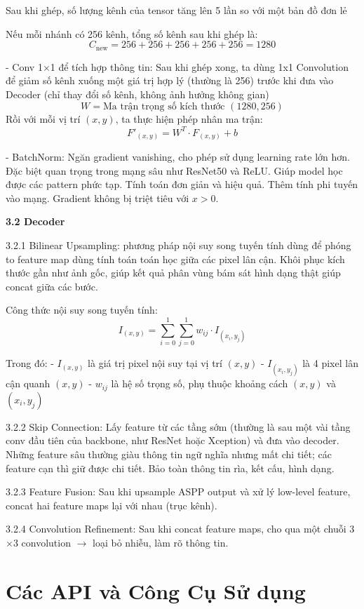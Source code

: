 \documentclass[12pt]{report}
\begin{document}
Sau khi ghép, số lượng kênh của tensor tăng lên 5 lần so với một bản đồ đơn lẻ

Nếu mỗi nhánh có 256 kênh, tổng số kênh sau khi ghép là:
\[
C_{\text{new}} = 256 + 256 + 256 + 256 + 256 = 1280
\]

- Conv 1$\times$1 để tích hợp thông tin: Sau khi ghép xong, ta dùng 1x1 Convolution để giảm số kênh xuống một giá trị hợp lý (thường là 256) trước khi đưa vào Decoder (chỉ thay đổi số kênh, không ảnh hưởng không gian)
\[
W = \text{Ma trận trọng số kích thước } (1280, 256)
\]
Rồi với mỗi vị trí $(x,y)$, ta thực hiện phép nhân ma trận:
\[
F'_{(x,y)} = W^T \cdot F_{(x,y)} + b
\]

- BatchNorm: Ngăn gradient vanishing, cho phép sử dụng learning rate lớn hơn. Đặc biệt quan trọng trong mạng sâu như ResNet50 và ReLU. Giúp model học được các pattern phức tạp. Tính toán đơn giản và hiệu quả. Thêm tính phi tuyến vào mạng. Gradient không bị triệt tiêu với $x > 0$.

\textbf{3.2 Decoder}

3.2.1 Bilinear Upsampling: phương pháp nội suy song tuyến tính dùng để phóng to feature map dùng tính toán toán học giữa các pixel lân cận. Khôi phục kích thước gần như ảnh gốc, giúp kết quả phân vùng bám sát hình dạng thật giúp concat giữa các bước.

Công thức nội suy song tuyến tính:
\[
I_{(x,y)} = \sum_{i=0}^1 \sum_{j=0}^1 w_{ij} \cdot I_{(x_i, y_j)}
\]

Trong đó:
- $I_{(x,y)}$ là giá trị pixel nội suy tại vị trí $(x,y)$
- $I_{(x_i, y_j)}$ là 4 pixel lân cận quanh $(x,y)$
- $w_{ij}$ là hệ số trọng số, phụ thuộc khoảng cách $(x,y)$ và $(x_i, y_j)$

3.2.2 Skip Connection: Lấy feature từ các tầng sớm (thường là sau một vài tầng conv đầu tiên của backbone, như ResNet hoặc Xception) và đưa vào decoder. Những feature sâu thường giàu thông tin ngữ nghĩa nhưng mất chi tiết; các feature cạn thì giữ được chi tiết. Bảo toàn thông tin rìa, kết cấu, hình dạng.

3.2.3 Feature Fusion: Sau khi upsample ASPP output và xử lý low-level feature, concat hai feature maps lại với nhau (trục kênh).

3.2.4 Convolution Refinement: Sau khi concat feature maps, cho qua một chuỗi 3$\times$3 convolution $\rightarrow$ loại bỏ nhiễu, làm rõ thông tin.

\section*{Các API và Công Cụ Sử dụng}
\end{document}
